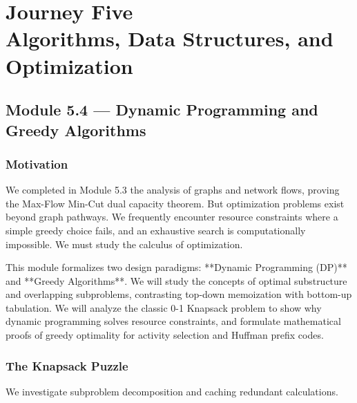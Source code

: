 \documentclass[12pt, a4paper]{book}
\begin{document}
\setcounter{chapter}{4}
\chapter[Journey 5 --- Algorithms, Data Structures, and Optimization]
        {Journey Five\\[8pt]
         \textcolor{ModuleColor}{\large Algorithms, Data Structures, and Optimization}}
\setcounter{section}{3}

\section{Module 5.4 --- Dynamic Programming and Greedy Algorithms}
\label{sec:mod5.4}

\subsection*{Motivation}

We completed in Module 5.3 the analysis of graphs and network flows, proving the Max-Flow Min-Cut dual capacity theorem.
But optimization problems exist beyond graph pathways.
We frequently encounter resource constraints where a simple greedy choice fails, and an exhaustive search is computationally impossible.
We must study the calculus of optimization.

This module formalizes two design paradigms: **Dynamic Programming (DP)** and **Greedy Algorithms**.
We will study the concepts of optimal substructure and overlapping subproblems, contrasting top-down memoization with bottom-up tabulation.
We will analyze the classic 0-1 Knapsack problem to show why dynamic programming solves resource constraints, and formulate mathematical proofs of greedy optimality for activity selection and Huffman prefix codes.

\subsection{The Knapsack Puzzle}

We investigate subproblem decomposition and caching redundant calculations.
\end{document}
